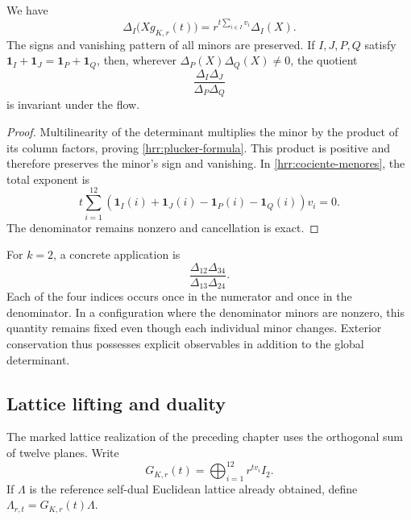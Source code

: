 \begin{proposition}
\label{hrr:plucker}
We have
\begin{equation}
 \Delta_I\bigl(Xg_{K,r}(t)\bigr)
 =r^{t\sum_{i\in I}v_i}\Delta_I(X).
 \label{hrr:plucker-formula}
\end{equation}
The signs and vanishing pattern of all minors are preserved. If \(I,J,P,Q\) satisfy \(\mathbf1_I+\mathbf1_J=\mathbf1_P+\mathbf1_Q\), then, wherever \(\Delta_P(X)\Delta_Q(X)\neq0\), the quotient
\begin{equation}
 \frac{\Delta_I\Delta_J}{\Delta_P\Delta_Q}
 \label{hrr:cociente-menores}
\end{equation}
is invariant under the flow.
\end{proposition}
\begin{proof}
Multilinearity of the determinant multiplies the minor by the product of its column factors, proving \eqref{hrr:plucker-formula}. This product is positive and therefore preserves the minor's sign and vanishing. In \eqref{hrr:cociente-menores}, the total exponent is
\[
 t\sum_{i=1}^{12}
 (\mathbf1_I(i)+\mathbf1_J(i)-\mathbf1_P(i)-\mathbf1_Q(i))v_i=0.
\]
The denominator remains nonzero and cancellation is exact.
\end{proof}

For \(k=2\), a concrete application is
\[
 \frac{\Delta_{12}\Delta_{34}}{\Delta_{13}\Delta_{24}}.
\]
Each of the four indices occurs once in the numerator and once in the denominator. In a configuration where the denominator minors are nonzero, this quantity remains fixed even though each individual minor changes. Exterior conservation thus possesses explicit observables in addition to the global determinant.

\subsection{Lattice lifting and duality}

The marked lattice realization of the preceding chapter uses the orthogonal sum of twelve planes. Write
\[
 G_{K,r}(t)=\bigoplus_{i=1}^{12}r^{tv_i}I_2.
\]
If \(\Lambda\) is the reference self-dual Euclidean lattice already obtained, define \(\Lambda_{r,t}=G_{K,r}(t)\Lambda\).

